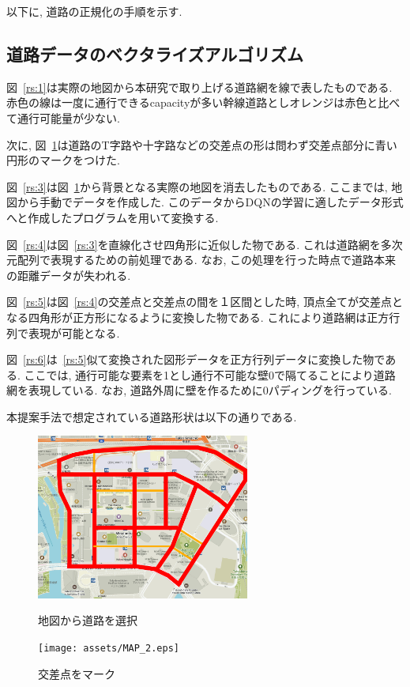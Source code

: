以下に, 道路の正規化の手順を示す.

\subsection{道路データのベクタライズアルゴリズム}

図~\ref{rs:1}は実際の地図から本研究で取り上げる道路網を線で表したものである. 赤色の線は一度に通行できるcapacityが多い幹線道路としオレンジは赤色と比べて通行可能量が少ない.

次に, 図~\ref{rs:2}は道路のT字路や十字路などの交差点の形は問わず交差点部分に青い円形のマークをつけた. 

図~\ref{rs:3}は図~\ref{rs:2}から背景となる実際の地図を消去したものである. ここまでは, 地図から手動でデータを作成した. このデータからDQNの学習に適したデータ形式へと作成したプログラムを用いて変換する.

図~\ref{rs:4}は図~\ref{rs:3}を直線化させ四角形に近似した物である. これは道路網を多次元配列で表現するための前処理である. なお, この処理を行った時点で道路本来の距離データが失われる.

図~\ref{rs:5}は図~\ref{rs:4}の交差点と交差点の間を１区間とした時, 頂点全てが交差点となる四角形が正方形になるように変換した物である. これにより道路網は正方行列で表現が可能となる.

図~\ref{rs:6}は~\ref{rs:5}似て変換された図形データを正方行列データに変換した物である. ここでは, 通行可能な要素を1とし通行不可能な壁0で隔てることにより道路網を表現している.
なお, 道路外周に壁を作るために0パディングを行っている.

本提案手法で想定されている道路形状は以下の通りである.


\begin{figure}[htbp]
    \begin{minipage}{0.5\hsize}
        \begin{center}
            \includegraphics[width=70mm]{assets/MAP_1.eps}
        \end{center}
        \caption{地図から道路を選択}
        \label{rs:1}
    \end{minipage}
    \begin{minipage}{0.5\hsize}
        \begin{center}
            \texttt{[image: assets/MAP\_2.eps]}
        \end{center}
        \caption{交差点をマーク}
        \label{rs:2}
    \end{minipage}
\end{figure}



